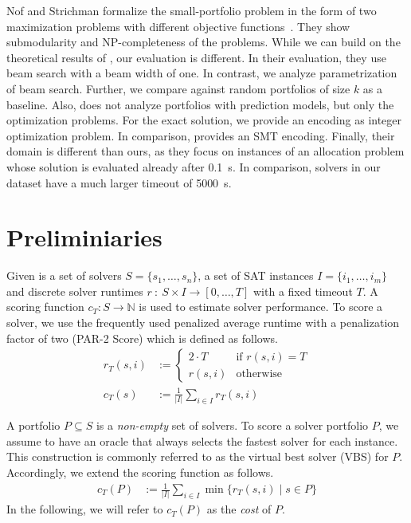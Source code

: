 \documentclass[conference]{IEEEtran}
\begin{document}
Nof and Strichman formalize the small-portfolio problem in the form of two maximization problems with different objective functions~\cite{nof2020real}.
They show submodularity and NP-completeness of the problems.
While we can build on the theoretical results of \cite{nof2020real}, our evaluation is different.
In their evaluation, they use beam search with a beam width of one.
In contrast, we analyze parametrization of beam search.
Further, we compare against random portfolios of size $k$ as a baseline.
Also, \cite{nof2020real} does not analyze portfolios with prediction models, but only the optimization problems.
For the exact solution, we provide an encoding as integer optimization problem.
In comparison, \cite{nof2020real} provides an SMT encoding.
Finally, their domain is different than ours, as they focus on instances of an allocation problem whose solution is evaluated already after 0.1~s.
In comparison, solvers in our dataset have a much larger timeout of 5000~s.


\section{Preliminiaries}
\label{sec:preliminaries}

Given is a set of solvers $S = \{s_1, \dots, s_n\}$, a set of SAT instances $I = \{i_1, \dots, i_m\}$ and discrete solver runtimes $r~:~S \times I \rightarrow [0, \dots, T]$ with a fixed timeout $T$. 
A scoring function $c_T : S \rightarrow \mathbb{N}$ is used to estimate solver performance. 
To score a solver, we use the frequently used penalized average runtime with a penalization factor of two (PAR-2 Score) which is defined as follows.%
\begin{align}
r_T(s,i) &:= \begin{cases}
	2 \cdot T & \text{if }r(s,i) = T\\
	r(s,i) & \text{otherwise}
\end{cases} \tag*{Penalized Runtimes}\\[.5em]
c_T(s) &:= \frac{1}{|I|} \sum_{i \in I}{r_T(s,i)} \tag*{PAR-2 Score}
\end{align}

A portfolio $P \subseteq S$ is a \emph{non-empty} set of solvers.
To score a solver portfolio $P$, we assume to have an oracle that always selects the fastest solver for each instance. 
This construction is commonly referred to as the virtual best solver (VBS) for $P$. 
Accordingly, we extend the scoring function as follows.%
\begin{align*}
	c_{T}(P) &:= \frac{1}{|I|} \sum\limits_{i \in I}{\min\{r_T(s,i) \mid s \in P\}}
\end{align*}%
%
In the following, we will refer to $c_{T}(P)$ as the \emph{cost} of $P$. 
\end{document}
